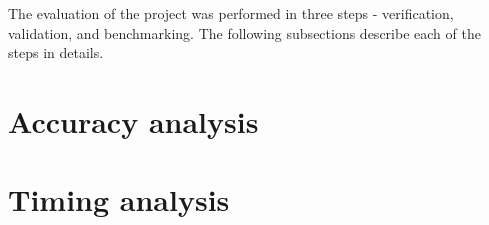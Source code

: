 The evaluation of the project was performed in three steps - verification, validation, and benchmarking. 
The following subsections describe each of the steps in details.
    \section{Accuracy analysis}
    \section{Timing analysis}
   